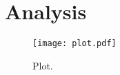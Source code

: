\chapter{Analysis}
\label{cha:analysis}

\begin{figure}
    \centering
    \texttt{[image: plot.pdf]}
    \caption{Plot.}
    \label{fig:plot}
\end{figure}